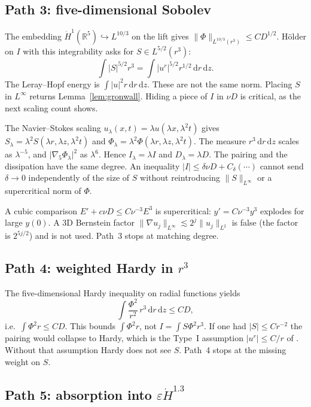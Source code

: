 \documentclass[11pt]{article}
\theoremstyle{definition}
\newcommand{\eps}{\varepsilon}
\newcommand{\R}{\mathbb{R}}
\newcommand{\dd}{\mathrm{d}}
\newcommand{\ur}{u^{r}}
\newcommand{\Ph}{\Phi}
\newcommand{\gradfive}{\nabla_{5}}
\newcommand{\Hdot}{\dot{H}}
\newcommand{\Lint}{L^{\infty}}
\newcommand{\norm}[2]{\|#1\|_{#2}}
\newcommand{\abs}[1]{\lvert#1\rvert}
\begin{document}
\subsection{Path 3: five-dimensional Sobolev}

The embedding \(\Hdot^1(\R^5)\hookrightarrow L^{10/3}\) on the lift
gives
\(\norm{\Ph}{L^{10/3}(r^3)}\le C D^{1/2}\).
H\"older on \(I\) with this integrability asks for
\(S\in L^{5/2}(r^3)\):
\[
  \int\abs{S}^{5/2}r^3
  =\int\abs{\ur}^{5/2}r^{1/2}\,\dd r\,\dd z.
\]
The Leray--Hopf energy is \(\int\abs{u}^2 r\,\dd r\,\dd z\). These
are not the same norm. Placing \(S\) in \(\Lint\) returns
Lemma~\ref{lem:gronwall}. Hiding a piece of \(I\) in \(\nu D\) is
critical, as the next scaling count shows.

The Navier--Stokes scaling
\(u_\lambda(x,t)=\lambda u(\lambda x,\lambda^2 t)\)
gives
\(S_\lambda=\lambda^2 S(\lambda r,\lambda z,\lambda^2 t)\) and
\(\Ph_\lambda=\lambda^2\Ph(\lambda r,\lambda z,\lambda^2 t)\).
The measure \(r^3\,\dd r\,\dd z\) scales as \(\lambda^{-5}\), and
\(\abs{\gradfive\Ph_\lambda}^2\) as \(\lambda^6\). Hence
\(I_\lambda=\lambda I\) and \(D_\lambda=\lambda D\).
The pairing and the dissipation have the same degree. An inequality
\(\abs{I}\le\delta\nu D+C_\delta(\cdots)\)
cannot send \(\delta\to 0\) independently of the size of \(S\) without
reintroducing \(\norm{S}{\Lint}\) or a supercritical norm of \(\Ph\).

A cubic comparison \(E'+c\nu D\le C\nu^{-3}E^3\) is supercritical:
\(y'=C\nu^{-3}y^3\) explodes for large \(y(0)\).
A 3D Bernstein factor \(\norm{\nabla u_j}{\Lint}\lesssim 2^j\norm{u_j}{L^2}\)
is false (the factor is \(2^{5j/2}\)) and is not used.
Path~3 stops at matching degree.

\subsection{Path 4: weighted Hardy in \(r^3\)}

The five-dimensional Hardy inequality on radial functions yields
\[
  \int\frac{\Ph^2}{r^2}\,r^3\,\dd r\,\dd z
  \le C D,
\]
i.e.\ \(\int\Ph^2 r\le C D\).
This bounds \(\int\Ph^2 r\), not \(I=\int S\Ph^2 r^3\).
If one had \(\abs{S}\le C r^{-2}\) the pairing would collapse to
Hardy, which is the Type~I assumption \(\abs{\ur}\le C/r\) of
\cite{CSTY2008}.
Without that assumption Hardy does not see \(S\).
Path~4 stops at the missing weight on \(S\).

\subsection{Path 5: absorption into \(\eps\Hdot^{1.3}\)}
\end{document}
